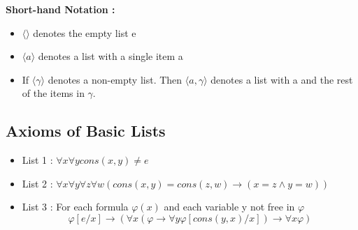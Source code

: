 \documentclass{article}
\begin{document}
\textbf{Short-hand Notation :}
\begin{itemize}
\item \(\langle \rangle\) denotes the empty list e 
\item \(\langle a \rangle \) denotes a list with a single item a
\item If \(\langle \gamma \rangle\) denotes a non-empty list. Then \(\langle a, \gamma \rangle\) denotes a list with a and the rest of the items in \(\gamma\). 
\end{itemize}

\subsection{Axioms of Basic Lists}
\begin{itemize}
\item List 1 : \(\forall x \forall y cons (x, y) \neq e \)
\item List 2 : \(\forall x \forall y \forall z \forall w (cons(x,y) = cons(z, w) \rightarrow (x = z \wedge y = w ))\)
\item List 3 : For each formula \(\varphi (x) \) and each variable y not free in \(\varphi\)
\[\varphi[e/x] \rightarrow (\forall x (\varphi \rightarrow \forall y \varphi [cons (y,x) / x ] ) \rightarrow \forall x \varphi) \]
\end{itemize}
\end{document}
